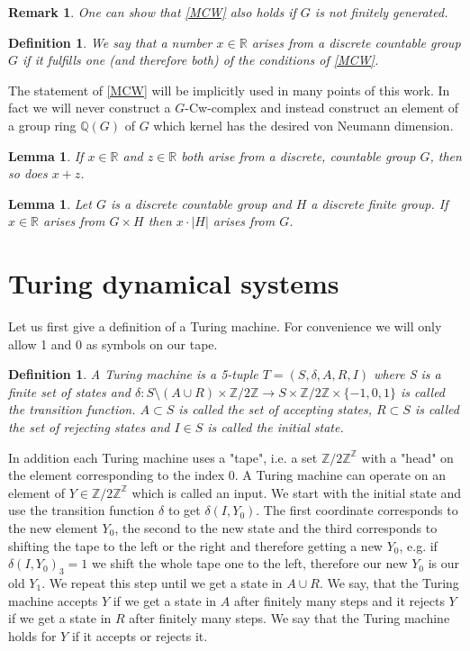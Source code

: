 \documentclass[12pt,a4paper]{scrartcl}
\newtheorem{Definition}[Theorem]{Definition}
\newtheorem{Lemma}[Theorem]{Lemma}
\newtheorem{Remark}[Theorem]{Remark}
\numberwithin{equation}{section}
\newcommand{\R}{\mathbb{R}} %
\newcommand{\Q}{\mathbb{Q}} %
\newcommand{\Z}{\mathbb{Z}} %
\newcommand{\2}{\mathbb{Z} / 2 \mathbb{Z}}
\newcommand{\1}{\bar{1}}
\newcommand{\0}{\bar{0}}
\begin{document}
\begin{Remark}
	One can show that \ref{MCW} also holds if $G$ is not finitely generated.
\end{Remark}
\begin{Definition}
	We say that a number $x \in \R$ \emph{arises} from a discrete countable group $G$ if it fulfills one (and therefore both) of the conditions of \ref{MCW}.
\end{Definition}
The statement of \ref{MCW} will be implicitly used in many points of this work. In fact we will never construct a $G$-Cw-complex and instead construct an element of a group ring $\Q (G)$ of $G$ which kernel has the desired von Neumann dimension.


\begin{Lemma}\label{add}
	If $x \in \R$ and $z \in \R$ both arise from a discrete, countable group $G$, then so does $x + z$.
\end{Lemma}
\begin{Lemma}\label{mult}
	Let $G$ is a discrete countable group and $H$ a discrete finite group. If $x \in \R$ arises from $G \times H$ then $x \cdot |H|$ arises from $G$.
\end{Lemma}
\section{Turing dynamical systems}
Let us first give a definition of a Turing machine. For convenience we will only allow 1 and 0 as symbols on our tape.
\begin{Definition}
	A Turing machine is a 5-tuple $T=(S,\delta, A, R, I)$ where S is a finite set of states and $\delta: S \setminus(A \cup R) \times \2 \to S \times \2 \times \{-1, 0, 1\}$ is called the transition function. $A \subset S$ is called the set of accepting states, $R \subset S$ is called the set of rejecting states and $I \in S$ is called the initial state.
\end{Definition}
In addition each Turing machine uses a "tape", i.e. a set $\Z / 2\Z ^{\Z}$ with a "head" on the element corresponding to the index 0. A Turing machine can operate on an element of $Y \in \Z / 2\Z ^{\Z}$ which is called an input. We start with the initial state and use the transition function $\delta$ to get $\delta(I, Y_0)$. The first coordinate corresponds to the new element $Y_0$, the second to the new state and the third corresponds to shifting the tape to the left or the right and therefore getting a new $Y_0$, e.g. if $\delta(I, Y_0)_3 = 1$ we shift the whole tape one to the left, therefore our new $Y_0$ is our old $Y_1$. We repeat this step until we get a state in $A \cup R$. We say, that the Turing machine accepts $Y$ if we get a state in $A$ after finitely many steps and it rejects $Y$ if we get a state in $R$ after finitely many steps. We say that the Turing machine holds for $Y$ if it accepts or rejects it.
\end{document}
